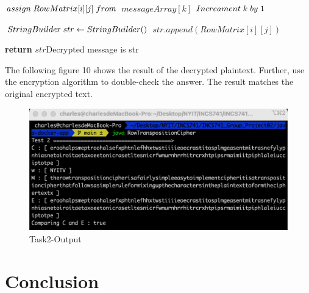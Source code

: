 \documentclass[twoside,twocolumn]{article}
\begin{document}
\begin{algorithm}
\begin{algorithmic}[1]
        	   \State $assign \hspace{0.1cm}  RowMatrix[i][j] \hspace{0.1cm}  from$
        	   \State $messageArray[k]$
        	   \State \footnotesize $Increament\hspace{0.1cm} k\hspace{0.1cm} by \hspace{0.1cm}1$	
        	   \State \footnotesize$ $
		    \EndIf
        \EndFor  
      \EndFor  
               
      \State \footnotesize $ StringBuilder\hspace{0.1cm} str \gets StringBuilder()$
	  		\State $ str.append(RowMatrix[i][j]) $
		    \EndIf
        \EndFor  
      \EndFor  
      
      \State \textbf{return} $str$\Comment \tiny{Decrypted message is str}
    \EndFunction
  \end{algorithmic}
\end{algorithm}

The following figure 10 shows the result of the decrypted plaintext. Further, use the encryption algorithm to double-check the answer. The result matches the original encrypted text.

\begin{figure}[H]
  \centering
  \includegraphics[scale=0.35]{./Graphs/Figure2.0.png}
  \caption{Task2-Output}
  \label{fig:testfig1}
\end{figure}




\section{Conclusion}
\end{document}
